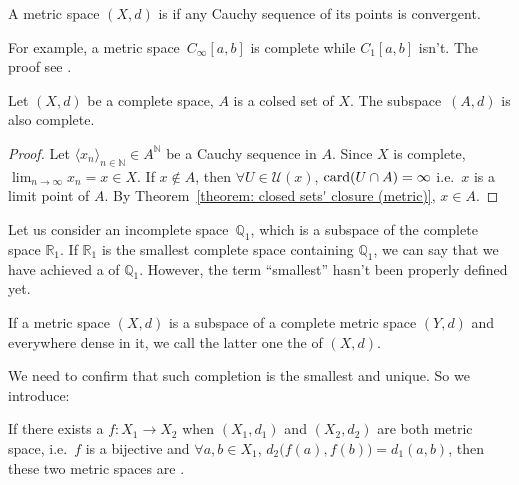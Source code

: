 \documentclass[openany]{book}
\begin{document}
\begin{definition}\label{definition: complete space}
	A metric space $(X, d)$ is  if any Cauchy sequence of its points is convergent.
\end{definition}

For example, a metric space~$C_\infty[a,b]$ is complete while $C_1[a,b]$ isn't. The proof see \cite[p.~22]{Zorich:2137923}.

\begin{theorem}
	\label{theorem: closed subspace of a complete space is complete}
	Let $(X, d)$ be a complete space, $A$ is a colsed set of $X$. 
	The subspace~$(A, d)$ is also complete.
\end{theorem}
\begin{proof}
	Let $\langle x_n \rangle_{n \in \mathbb N} \in A^\mathbb N$ be a Cauchy sequence in $A$.
	Since $X$ is complete, $\lim_{n \to \infty} x_n = x \in X$. 
	If $x \notin A$, then $\forall U \in \mathscr U(x)$, $\operatorname{card}(U \cap A) = \infty$ i.e.\ $x$ is a limit point of $A$. By Theorem~\ref{theorem: closed sets' closure (metric)}, $x \in A$.
\end{proof}

Let us consider an incomplete space~$\mathbb Q_1$, which is a subspace of the complete space $\mathbb R_1$. 
If $\mathbb R_1$ is the smallest complete space containing $\mathbb Q_1$, we can say that we have achieved a  of $\mathbb Q_1$. 
However, the term ``smallest'' hasn't been properly defined yet.

\begin{definition}[completion]\label{definition: completion}
	If a metric space $(X, d)$ is a subspace of a complete metric space $(Y, d)$ and everywhere dense in it, we call the latter one the  of $(X, d)$. 
\end{definition}

We need to confirm that such completion is the smallest and unique. So we introduce:

\begin{definition}[isometry]\label{definition: isometric}
	If there exists a  $f \colon X_1 \to X_2$ when $(X_1, d_1)$ and $(X_2, d_2)$ are both metric space, i.e.\ 
		$f$ is a bijective and $\forall a, b \in X_1$, $d_2 \big(f(a), f(b)\big)=d_1 (a, b)$, then these two metric spaces are .
\end{definition}
\end{document}
